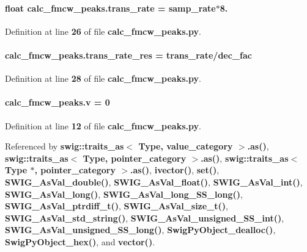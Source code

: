\paragraph[{trans\+\_\+rate}]{\setlength{\rightskip}{0pt plus 5cm}float calc\+\_\+fmcw\+\_\+peaks.\+trans\+\_\+rate = {\bf samp\+\_\+rate}$\ast$8.}\label{namespacecalc__fmcw__peaks_aea4c573de9427e0a53f9e3968bfa5533}


Definition at line {\bf 26} of file {\bf calc\+\_\+fmcw\+\_\+peaks.\+py}.

\paragraph[{trans\+\_\+rate\+\_\+res}]{\setlength{\rightskip}{0pt plus 5cm}calc\+\_\+fmcw\+\_\+peaks.\+trans\+\_\+rate\+\_\+res = {\bf trans\+\_\+rate}/{\bf dec\+\_\+fac}}\label{namespacecalc__fmcw__peaks_a00bd620dd8fccf522996e1470f45e758}


Definition at line {\bf 28} of file {\bf calc\+\_\+fmcw\+\_\+peaks.\+py}.

\paragraph[{v}]{ calc\+\_\+fmcw\+\_\+peaks.\+v = 0}\label{namespacecalc__fmcw__peaks_a69fa5b008bd5717fecadb48311b46011}


Definition at line {\bf 12} of file {\bf calc\+\_\+fmcw\+\_\+peaks.\+py}.



Referenced by {\bf swig\+::traits\+\_\+as$<$ Type, value\+\_\+category $>$.\+as()}, {\bf swig\+::traits\+\_\+as$<$ Type, pointer\+\_\+category $>$.\+as()}, {\bf swig\+::traits\+\_\+as$<$ Type $\ast$, pointer\+\_\+category $>$.\+as()}, {\bf ivector()}, {\bf set()}, {\bf S\+W\+I\+G\+\_\+\+As\+Val\+\_\+double()}, {\bf S\+W\+I\+G\+\_\+\+As\+Val\+\_\+float()}, {\bf S\+W\+I\+G\+\_\+\+As\+Val\+\_\+int()}, {\bf S\+W\+I\+G\+\_\+\+As\+Val\+\_\+long()}, {\bf S\+W\+I\+G\+\_\+\+As\+Val\+\_\+long\+\_\+\+S\+S\+\_\+long()}, {\bf S\+W\+I\+G\+\_\+\+As\+Val\+\_\+ptrdiff\+\_\+t()}, {\bf S\+W\+I\+G\+\_\+\+As\+Val\+\_\+size\+\_\+t()}, {\bf S\+W\+I\+G\+\_\+\+As\+Val\+\_\+std\+\_\+string()}, {\bf S\+W\+I\+G\+\_\+\+As\+Val\+\_\+unsigned\+\_\+\+S\+S\+\_\+int()}, {\bf S\+W\+I\+G\+\_\+\+As\+Val\+\_\+unsigned\+\_\+\+S\+S\+\_\+long()}, {\bf Swig\+Py\+Object\+\_\+dealloc()}, {\bf Swig\+Py\+Object\+\_\+hex()}, and {\bf vector()}.


